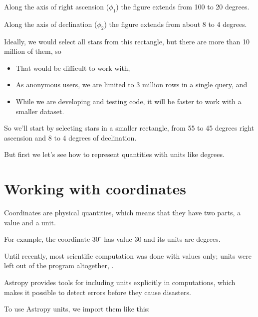 \documentclass[letterpaper,10pt,english]{sphinxmanual}
\begin{document}
Along the axis of right ascension (\(\phi_1\)) the figure extends from \sphinxhyphen{}100 to 20 degrees.

Along the axis of declination (\(\phi_2\)) the figure extends from about \sphinxhyphen{}8 to 4 degrees.

Ideally, we would select all stars from this rectangle, but there are more than 10 million of them, so
\begin{itemize}
\item {} 
That would be difficult to work with,

\item {} 
As anonymous users, we are limited to 3 million rows in a single query, and

\item {} 
While we are developing and testing code, it will be faster to work with a smaller dataset.

\end{itemize}

So we’ll start by selecting stars in a smaller rectangle, from \sphinxhyphen{}55 to \sphinxhyphen{}45 degrees right ascension and \sphinxhyphen{}8 to 4 degrees of declination.

But first we let’s see how to represent quantities with units like degrees.


\section{Working with coordinates}
\label{\detokenize{02_coords:working-with-coordinates}}
Coordinates are physical quantities, which means that they have two parts, a value and a unit.

For example, the coordinate \(30^{\circ}\) has value 30 and its units are degrees.

Until recently, most scientific computation was done with values only; units were left out of the program altogether, .

Astropy provides tools for including units explicitly in computations, which makes it possible to detect errors before they cause disasters.

To use Astropy units, we import them like this:

\begin{sphinxVerbatim}[commandchars=\\\{\}]
   

\end{sphinxVerbatim}
\end{document}
